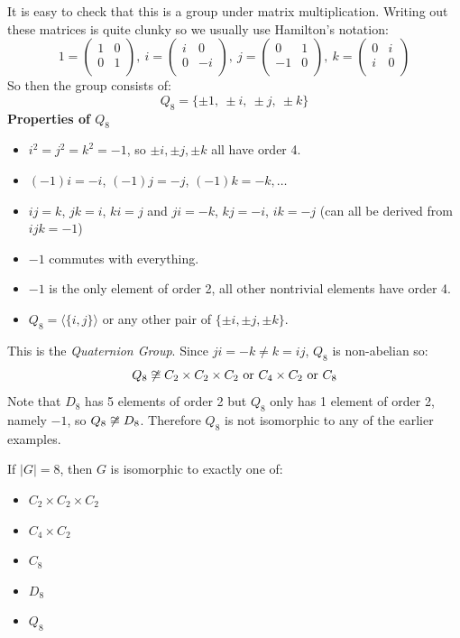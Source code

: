 \documentclass[../main.tex]{subfiles}
\begin{document}
\begin{example}
  It is easy to check that this is a group under matrix multiplication.
  Writing out these matrices is quite clunky so we usually use Hamilton's notation:
  \[
    1 = \begin{pmatrix}
    1 & 0 \\
    0 & 1 \\
    \end{pmatrix},\
    i = \begin{pmatrix}
    i & 0 \\
    0 & -i \\
    \end{pmatrix},\
    j = \begin{pmatrix}
    0 & 1 \\
    -1 & 0 \\
    \end{pmatrix},\
    k = \begin{pmatrix}
    0 & i \\
    i & 0 \\
    \end{pmatrix}
  \]
  So then the group consists of:
  \[
    Q_8 = \{\pm 1,\ \pm i,\ \pm j,\ \pm k\}
  \]
  \textbf{Properties of $Q_8$}
  \begin{itemize}
    \item $i^2 = j^2 = k^2 = -1$, so $\pm i, \pm j, \pm k$ all have order 4.
    \item $(-1)i = -i$, $(-1)j = -j$, $(-1)k = -k,\ldots$
    \item $ij = k$, $jk = i$, $ki = j$ and $ji = -k$, $kj = -i$, $ik = -j$ (can all be derived from $ijk = -1$)
    \item $-1$ commutes with everything.
    \item $-1$ is the only element of order 2, all other nontrivial elements have order 4.
    \item $Q_8 = \langle \{i, j\} \rangle$ or any other pair of $\{\pm i, \pm j, \pm k\}$.
  \end{itemize}
  This is the \textit{Quaternion Group}.
  Since $ji = -k \neq k = ij$, $Q_8$ is non-abelian so:
  \[
    Q_8 \centernot \cong C_2 \times C_2 \times C_2 \text{ or } C_4 \times C_2 \text{ or } C_8
  \]
  Note that $D_8$ has 5 elements of order 2 but $Q_8$ only has 1 element of order 2, namely $-1$, so $Q_8 \centernot\cong D_8$.
  Therefore $Q_8$ is not isomorphic to any of the earlier examples.
\end{example}
\begin{lemma}[Groups of Order 8]
  If $|G| = 8$, then $G$ is isomorphic to exactly one of:
  \begin{itemize}
    \item $C_2 \times C_2 \times C_2$
    \item $C_4 \times C_2$
    \item $C_8$
    \item $D_8$
    \item $Q_8$
  \end{itemize}
\end{lemma}
\end{document}
